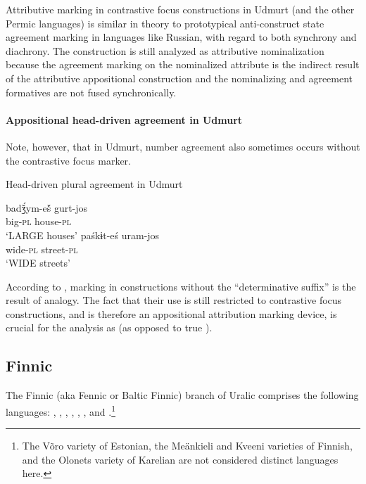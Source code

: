 Attributive marking in contrastive focus constructions in Udmurt (and the other Permic languages) is similar in theory to prototypical anti\hyp{}construct state agreement marking in languages like Russian, with regard to both synchrony and diachrony. The construction is still analyzed as attributive nominalization because the agreement marking on the nominalized attribute is the indirect result of the attributive appositional construction and the nominalizing and agreement formatives are not fused synchronically.

\paragraph*{Appositional head\hyp{}driven agreement in Udmurt}
Note, however, that in Udmurt, number agreement also sometimes occurs without the contrastive focus marker.
\begin{exe}
\ex \rm{Head\hyp{}driven plural agreement in Udmurt}
\begin{xlist}
\ex 
\gll	badǯ́ym-eš́ gurt-jos\\
	big-\textsc{pl} house-\textsc{pl}\\
\glt	‘LARGE houses’ \citep[40]{winkler2001}
\ex 
\gll	paśkɨt-eś uram-jos\\
	wide-\textsc{pl} street-\textsc{pl}\\
\glt	‘WIDE streets’ \citep[63]{csucs1990}
\end{xlist}
\end{exe}
According to \citet[63]{csucs1990},  marking in constructions without the “determinative suffix” is the result of analogy. The fact that their use is still restricted to contrastive focus constructions, and is therefore an appositional attribution marking device, is crucial for the analysis as  (as opposed to true ).

\subsection{Finnic}
The Finnic (aka Fennic or Baltic Finnic) branch of Uralic comprises the following languages: , , , , , ,  and .\footnote{The Võro variety of Estonian, the Meänkieli and Kveeni varieties of Finnish, and the Olonets variety of Karelian are not considered distinct languages here.}

